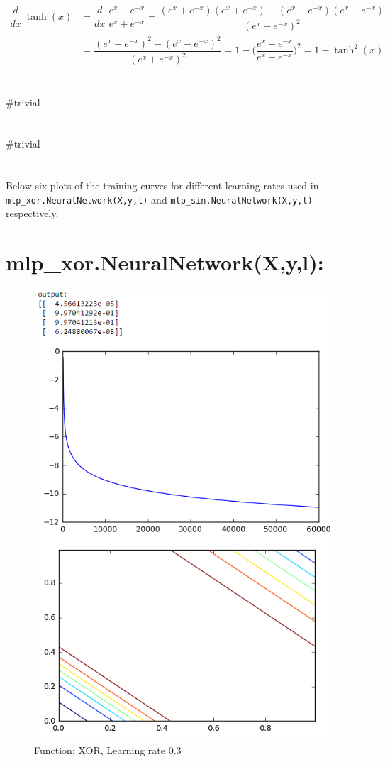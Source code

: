 \documentclass[11pt]{article}
\newcommand{\exercise}{\section{}}
\begin{document}
\begin{align*}
	\dfrac{d}{dx}\ \tanh(x) &= \dfrac{d}{dx}\ \dfrac{e^x - e^{-x}}{e^x + e^{-x}} 
	= \dfrac{(e^x + e^{-x})(e^x + e^{-x}) - (e^x - e^{-x})(e^x - e^{-x})}{(e^x + e^{-x})^2}\\
	&= \dfrac{(e^x + e^{-x})^2 - (e^x - e^{-x})^2}{(e^x + e^{-x})^2} = 1 - \Big(\dfrac{e^x - e^{-x}}{e^x + e^{-x}}\Big)^2 = 1 - \tanh^2(x)
\end{align*}

\exercise
\#trivial

\exercise
\#trivial

\exercise
Below six plots of the training curves for different learning rates used in \texttt{mlp\_xor.NeuralNetwork(X,y,l)} and \texttt{mlp\_sin.NeuralNetwork(X,y,l)} respectively.
\section*{mlp\_xor.NeuralNetwork(X,y,l):}
\begin{figure}[H]
	\centering
	\includegraphics[width=0.7\linewidth]{xor_lr03}
	\caption{Function: XOR, Learning rate 0.3}
	\label{fig:xorlr03}
\end{figure}
\end{document}
